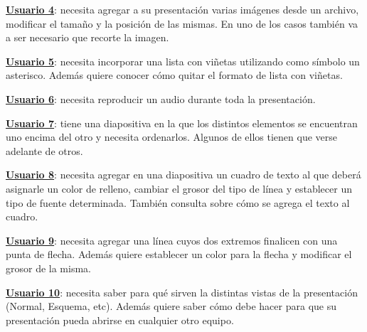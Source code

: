 \documentclass[12pt]{article}
\begin{document}
\textbf{\underline{Usuario 4}}: necesita agregar a su presentación varias imágenes desde un archivo,  modificar el tamaño y la posición de las mismas. En uno de los casos también va a ser necesario que recorte la imagen. 

\textbf{\underline{Usuario 5}}: necesita incorporar una lista con viñetas utilizando como símbolo un asterisco. Además quiere conocer cómo quitar el formato de lista con viñetas.

\textbf{\underline{Usuario 6}}: necesita reproducir un audio durante toda la presentación. 

\textbf{\underline{Usuario 7}}: tiene una diapositiva en la que los distintos elementos se encuentran uno encima del otro y necesita ordenarlos. Algunos de ellos tienen que verse adelante de otros. 

\textbf{\underline{Usuario 8}}: necesita agregar en una diapositiva un cuadro de texto al que deberá asignarle un color de relleno, cambiar el grosor del tipo de línea y establecer un tipo de fuente determinada. También consulta sobre cómo se agrega el texto al cuadro.

\textbf{\underline{Usuario 9}}: necesita agregar una línea cuyos dos extremos finalicen con una punta de flecha. Además quiere establecer un color para la flecha y modificar el grosor de la misma.

\textbf{\underline{Usuario 10}}: necesita saber para qué sirven la distintas vistas de la presentación (Normal, Esquema, etc). Además quiere saber cómo debe hacer para que su presentación pueda abrirse en cualquier otro equipo.
 
\end{document}
